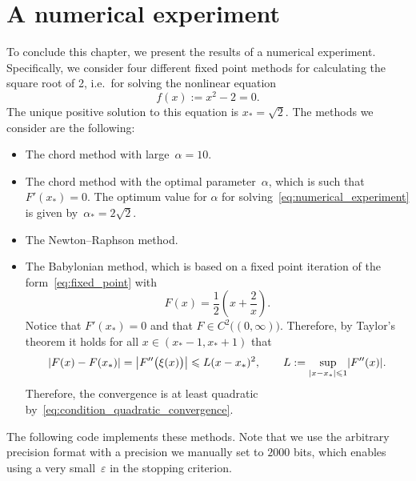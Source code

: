 \section{A numerical experiment}
To conclude this chapter,
we present the results of a numerical experiment.
Specifically,
we consider four different fixed point methods for calculating the square root of 2,
i.e.\ for solving the nonlinear equation
\begin{equation}
    \label{eq:numerical_experiment}
    f(x) := x^2 - 2 = 0.
\end{equation}
The unique positive solution to this equation is $x_* = \sqrt{2}$.
The methods we consider are the following:
\begin{itemize}
    \item
        The chord method with large~$\alpha = 10$.

    \item
        The chord method with the optimal parameter~$\alpha$,
        which is such that $F'(x_*) = 0$.
        The optimum value for $\alpha$ for solving~\eqref{eq:numerical_experiment} is given by~$\alpha_* = 2 \sqrt{2}$.

    \item
        The Newton--Raphson method.

    \item
        The Babylonian method,
        which is based on a fixed point iteration of the form~\eqref{eq:fixed_point} with
        \[
            F(x) = \frac{1}{2} \left(x + \frac{2}{x} \right).
        \]
        Notice that $F'(x_*) = 0$ and that $F \in C^2\bigl((0, \infty)\bigr)$.
        Therefore, by Taylor's theorem it holds for all $x \in (x_*-1, x_* + 1)$ that
        \[
            \left\lvert F(x) - F(x_*) \right\rvert
            = \left\lvert F''\bigl(\xi(x)\bigr) \right\rvert
            \leqslant L (x - x_*)^2,
            \qquad L:= \sup_{\lvert x - x_*\rvert \leqslant 1} \lvert F''(x)\rvert.
        \]
        Therefore,
        the convergence is at least quadratic by~\eqref{eq:condition_quadratic_convergence}.
\end{itemize}
The following code implements these methods.
Note that we use the arbitrary precision  format with a precision we manually set to $2000$ bits,
which enables using a very small~$\varepsilon$ in the stopping criterion.
